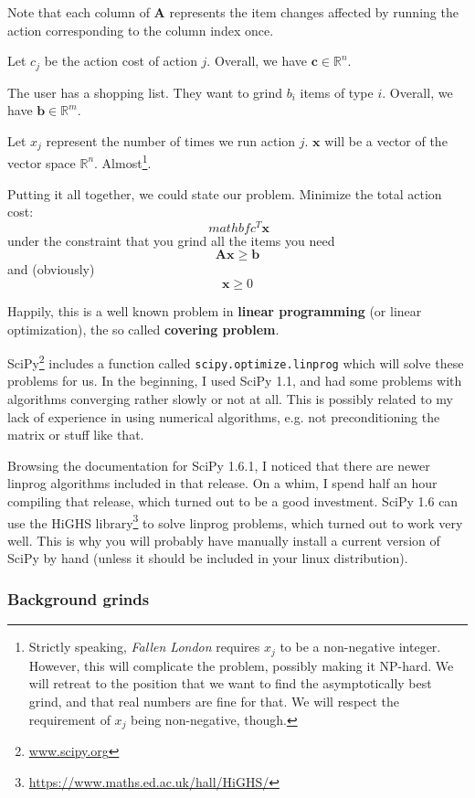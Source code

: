 \documentclass[a4paper,11pt,openright,twoside]{scrartcl}
\begin{document}
Note that each column of  $\mathbf{A}$ represents the item changes affected by running the action corresponding to the column index once. 

Let $c_j$ be the action cost of action $j$. Overall, we have $\mathbf{c}\in \mathbb{R}^n$.

The user has a shopping list. They want to grind $b_i$ items of type $i$. Overall, we have $\mathbf{b}\in \mathbb{R}^m$.

Let $x_j$ represent the number of times we run action $j$. $\mathbf{x}$ will be a vector of the vector space $\mathbb{R}^n$. Almost\footnote{Strictly speaking, \emph{Fallen London} requires $x_j$ to be a non-negative integer. However, this will complicate the problem, possibly making it NP-hard. We will retreat to the position that we want to find the asymptotically best grind, and that real numbers are fine for that. We will respect the requirement of $x_j$ being non-negative, though.}.

Putting it all together, we could state our problem. Minimize the total action cost: \[\ mathbf{c}^T\mathbf{x} \] under the constraint that you grind all the items you need \[\mathbf{A}\mathbf{x} \geq \mathbf{b} \]
and (obviously) \[\mathbf{x} \geq 0 \]

Happily, this is a well known problem in \textbf{linear programming} (or linear optimization), the so called \textbf{covering problem}.

SciPy\footnote{\url{www.scipy.org}} includes a function called \texttt{scipy.optimize.linprog} which will solve these problems for us. In the beginning, I used SciPy 1.1, and had some problems with algorithms converging rather slowly or not at all. This is possibly related to my lack of experience in using numerical algorithms, e.g. not preconditioning the matrix or stuff like that.

Browsing the documentation for SciPy 1.6.1, I noticed that there are newer linprog algorithms included in that release. On a whim, I spend half an hour compiling that release, which turned out to be a good investment. SciPy 1.6 can use the HiGHS library\footnote{\url{https://www.maths.ed.ac.uk/hall/HiGHS/}} to solve linprog problems, which turned out to work very well. This is why you will probably have manually install a current version of SciPy by hand (unless it should be included in your linux distribution).

\subsubsection{Background grinds}
\end{document}
